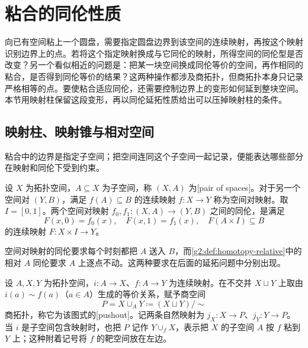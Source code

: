 
% 
% 

\section{粘合的同伦性质}
\label{g2:sec:0102}

向已有空间粘上一个圆盘，需要指定圆盘边界到该空间的连续映射，再按这个映射识别边界上的点。若将这个指定映射换成与它同伦的映射，所得空间的同伦型是否改变？另一个看似相近的问题是：把某一块空间换成同伦等价的空间，再作相同的粘合，是否得到同伦等价的结果？这两种操作都涉及商拓扑，但商拓扑本身只记录严格相等的点。要使粘合适应同伦，还需要控制边界上的变形如何延到整块空间。本节用映射柱保留这段变形，再以同伦延拓性质给出可以压掉映射柱的条件。

\subsection{映射柱、映射锥与相对空间}
\label{g2:subsec:0102:01}
粘合中的边界是指定子空间；把空间连同这个子空间一起记录，便能表达哪些部分在映射和同伦下受到约束。

\begin{definition}\label{g2:def:space-pair}
	设 \(X\) 为拓扑空间，\(A\subseteq X\) 为子空间，称 \((X,A)\) 为[pair of spaces]。对于另一个空间对 \((Y,B)\)，满足 \(f(A)\subseteq B\) 的连续映射 \(f:X\to Y\) 称为空间对映射。取 \(I=[0,1]\)。两个空间对映射 \(f_0,f_1:(X,A)\to(Y,B)\) 之间的同伦，是满足
	\[
		F(x,0)=f_0(x),\quad F(x,1)=f_1(x),\quad F(A\times I)\subseteq B
	\]
	的连续映射 \(F:X\times I\to Y\)。
\end{definition}

空间对映射的同伦要求每个时刻都把 \(A\) 送入 \(B\)，而\cref{g2:def:homotopy-relative}中的相对 \(A\) 同伦要求 \(A\) 上逐点不动。这两种要求在后面的延拓问题中分别出现。

\begin{definition}[空间的推出]\label{g2:def:pushout-space}
	设 \(A,X,Y\) 为拓扑空间，\(i:A\to X\)、\(f:A\to Y\) 为连续映射。在不交并 \(X\sqcup Y\) 上取由 \(i(a)\sim f(a)\)（\(a\in A\)）生成的等价关系，赋予商空间
	\[
		P=X\cup_A Y\coloneqq(X\sqcup Y)/\!\sim
	\]
	商拓扑，称它为该图式的[pushout]。记两条自然映射为 \(j_X:X\to P\)、\(j_Y:Y\to P\)。当 \(i\) 是子空间包含映射时，也把 \(P\) 记作 \(Y\cup_fX\)，表示把 \(X\) 的子空间 \(A\) 按 \(f\) 粘到 \(Y\) 上；这种附着记号将 \(f\) 的靶空间放在左边。
\end{definition}

